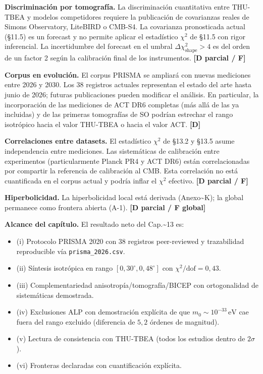 ﻿\documentclass[11pt,letterpaper]{article}
\begin{document}
\textbf{Discriminación por tomografía.} La discriminación cuantitativa entre THU-TBEA y modelos competidores requiere la publicación de covarianzas reales de Simons Observatory, LiteBIRD o CMB-S4. La covarianza pronosticada actual (§11.5) es un forecast y no permite aplicar el estadístico $\chi^2$ de §11.5 con rigor inferencial. La incertidumbre del forecast en el umbral $\Delta\chi^2_{\text{shape}} > 4$ es del orden de un factor 2 según la calibración final de los instrumentos. \textbf{[D parcial / F]}

\textbf{Corpus en evolución.} El corpus PRISMA se ampliará con nuevas mediciones entre 2026 y 2030. Los 38 registros actuales representan el estado del arte hasta junio de 2026; futuras publicaciones pueden modificar el análisis. En particular, la incorporación de las mediciones de ACT DR6 completas (más allá de las ya incluidas) y de las primeras tomografías de SO podrían estrechar el rango isotrópico hacia el valor THU-TBEA o hacia el valor ACT. \textbf{[D]}

\textbf{Correlaciones entre datasets.} El estadístico $\chi^2$ de §13.2 y §13.5 asume independencia entre mediciones. Las sistemáticas de calibración entre experimentos (particularmente Planck PR4 y ACT DR6) están correlacionadas por compartir la referencia de calibración al CMB. Esta correlación no está cuantificada en el corpus actual y podría inflar el $\chi^2$ efectivo. \textbf{[D parcial / F]}

\textbf{Hiperbolicidad.} La hiperbolicidad local está derivada (Anexo\textasciitilde{}K); la global permanece como frontera abierta (A-1). \textbf{[D parcial / F global]}

\textbf{Alcance del capítulo.} El resultado neto del Cap.\textasciitilde{}13 es:

\begin{itemize}[leftmargin=*]
\item (i) Protocolo PRISMA 2020 con 38 registros peer-reviewed y trazabilidad reproducible vía \texttt{prisma\_2026.csv}.
\item (ii) Síntesis isotrópica en rango $[0{,}30^\circ, 0{,}48^\circ]$ con $\chi^2/\mathrm{dof} = 0{,}43$.
\item (iii) Complementariedad anisotropía/tomografía/BICEP con ortogonalidad de sistemáticas demostrada.
\item (iv) Exclusiones ALP con demostración explícita de que $m_0 \sim 10^{-33}\,\mathrm{eV}$ cae fuera del rango excluido (diferencia de $5{,}2$ órdenes de magnitud).
\item (v) Lectura de consistencia con THU-TBEA (todos los estudios dentro de $2\sigma$).
\item (vi) Fronteras declaradas con cuantificación explícita.
\end{itemize}
\end{document}
